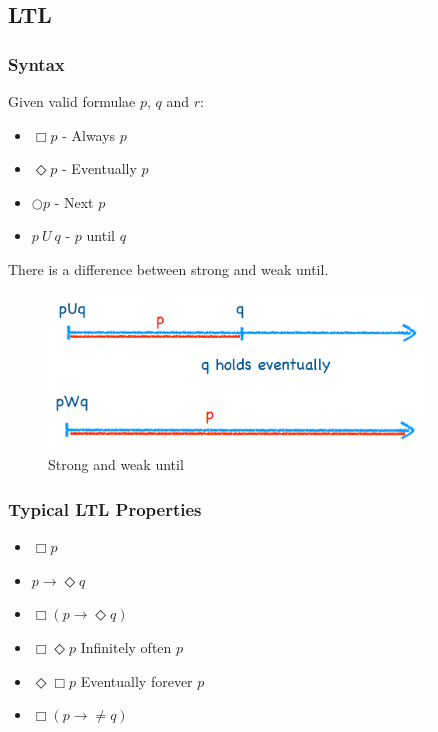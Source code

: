 \documentclass[11pt]{article}
\theoremstyle{definition}
\begin{document}
\subsection{LTL}

\subsubsection{Syntax}
Given valid formulae $p$, $q$ and $r$:
\begin{itemize}
\item $\Box p$ - Always $p$
\item $\Diamond p$ - Eventually $p$
\item $\Circle p$ - Next $p$
\item $p\ U\ q$  - $p$ until $q$
\end{itemize}
There is a difference between strong and weak until. 

\begin{figure}[H]
\centering
\includegraphics[width=0.9\textwidth, keepaspectratio]{imgs/strong-weak-until.png}
\caption{Strong and weak until}
\end{figure}

\subsubsection{Typical LTL Properties}
\begin{itemize}
\item{ $\Box p$}
\item{ $p \rightarrow \Diamond q$}
\item{ $\Box (p \rightarrow \Diamond q)$}
\item{ $\Box \Diamond p$ Infinitely often $p$}
\item{ $\Diamond \Box p$ Eventually forever $p$}
\item{ $\Box (p \rightarrow \neq q)$}
\end{itemize}
\end{document}
